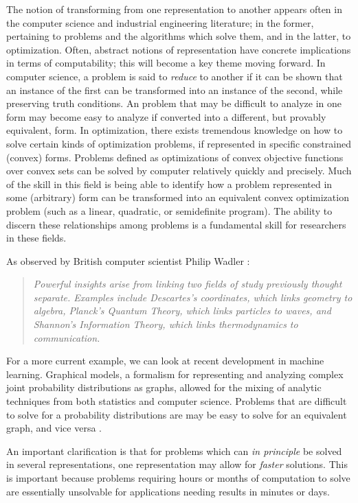 \documentclass[12pt]{book}
\begin{document}
\bigskip

The notion of transforming from one representation to another appears often in the computer science and industrial engineering literature; in the former, pertaining to problems and the algorithms which solve them, and in the latter, to optimization.
Often, abstract notions of representation have concrete implications in terms of computability; this will become a key theme moving forward.
In computer science, a problem is said to \textit{reduce} to another if it can be shown that an instance of the first can be transformed into an instance of the second, while preserving truth conditions.
An problem that may be difficult to analyze in one form may become easy to analyze if converted into a different, but provably equivalent, form.
In optimization, there exists tremendous knowledge on how to solve certain kinds of optimization problems, if represented in specific constrained (convex) forms.
Problems defined as optimizations of convex objective functions over convex sets can be solved by computer relatively quickly and precisely.
Much of the skill in this field is being able to identify how a problem represented in some (arbitrary) form can be transformed into an equivalent convex optimization problem (such as a linear, quadratic, or semidefinite program).
The ability to discern these relationships among problems is a fundamental skill for researchers in these fields.

\bigskip

As observed by British computer scientist Philip Wadler \cite{wadler}: 

\begin{quotation}
\textit{
	Powerful insights arise from linking two fields of study previously thought separate.
	Examples include Descartes's coordinates, which links geometry to algebra, Planck's Quantum Theory, which links particles to waves, and Shannon's Information Theory, which links thermodynamics to communication.
	}
\end{quotation}

For a more current example, we can look at recent development in machine learning.
Graphical models, a formalism for representing and analyzing complex joint probability distributions as graphs, allowed for the mixing of analytic techniques from both statistics and computer science.
Problems that are difficult to solve for a probability distributions are may be easy to solve for an equivalent graph, and vice versa \cite{wainwright}.

An important clarification is that for problems which can \textit{in principle} be solved in several representations, one representation may allow for \textit{faster} solutions.
This is important because problems requiring hours or months of computation to solve are essentially unsolvable for applications needing results in minutes or days.
\end{document}
